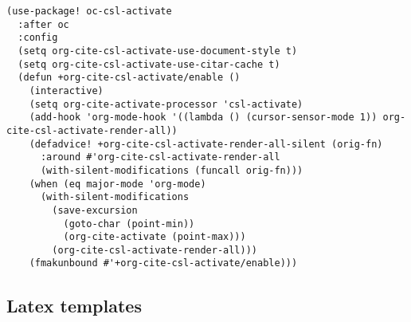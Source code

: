 \documentclass[c]{article}
\theoremstyle{plain}%
\theoremstyle{definition}
\theoremstyle{remark}
\begin{document}
\begin{verbatim}
(use-package! oc-csl-activate
  :after oc
  :config
  (setq org-cite-csl-activate-use-document-style t)
  (setq org-cite-csl-activate-use-citar-cache t)
  (defun +org-cite-csl-activate/enable ()
    (interactive)
    (setq org-cite-activate-processor 'csl-activate)
    (add-hook 'org-mode-hook '((lambda () (cursor-sensor-mode 1)) org-cite-csl-activate-render-all))
    (defadvice! +org-cite-csl-activate-render-all-silent (orig-fn)
      :around #'org-cite-csl-activate-render-all
      (with-silent-modifications (funcall orig-fn)))
    (when (eq major-mode 'org-mode)
      (with-silent-modifications
        (save-excursion
          (goto-char (point-min))
          (org-cite-activate (point-max)))
        (org-cite-csl-activate-render-all)))
    (fmakunbound #'+org-cite-csl-activate/enable)))
\end{verbatim}
\subsection{Latex templates}
\label{sec:org42fdf7a}
\end{document}
